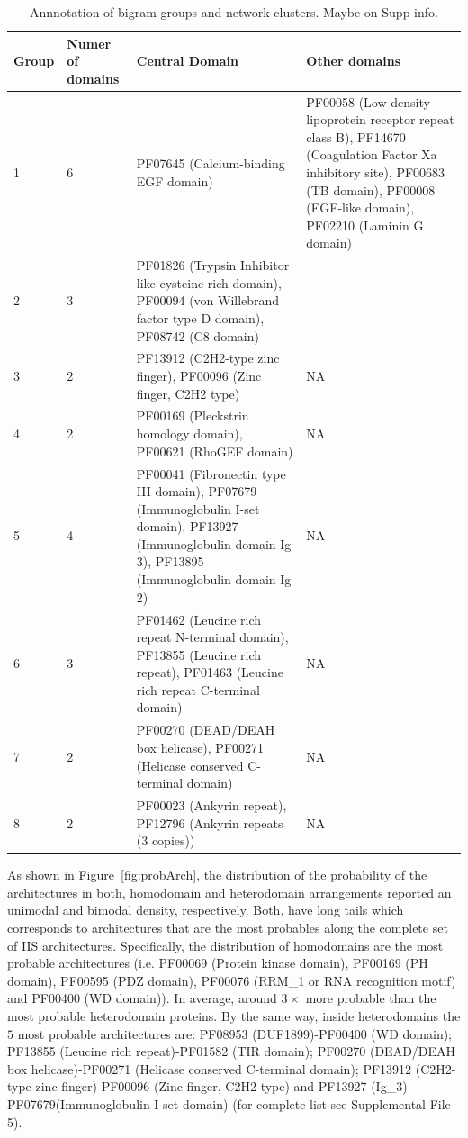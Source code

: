 \documentclass[11pt]{article}
\newcommand{\TODO}[1]{\begingroup\color{red}#1\endgroup}
\begin{document}
\begin{table}
\centering
\begin{tabular}{p{1cm}p{1.5cm}p{7cm}p{5cm}}
  \toprule 
  \textbf{Group} & \textbf{Numer of domains} & \textbf{Central Domain} & \textbf{Other domains} \\
  \midrule 
  1 & 6 & PF07645 (Calcium-binding EGF domain)& PF00058 (Low-density lipoprotein receptor repeat class B),
  PF14670 (Coagulation Factor Xa inhibitory site), PF00683 (TB domain), PF00008 (EGF-like domain), 
  PF02210 (Laminin G domain) \\
  2 & 3 & PF01826 (Trypsin Inhibitor like cysteine rich domain), PF00094 (von Willebrand factor type D domain), 
  PF08742 (C8 domain) \\
  3 & 2 & PF13912 (C2H2-type zinc finger), PF00096 (Zinc finger, C2H2 type) & NA \\
  4 & 2 & PF00169 (Pleckstrin homology domain), PF00621 (RhoGEF domain) & NA \\
  5 & 4 & PF00041 (Fibronectin type III domain), PF07679 (Immunoglobulin I-set domain), 
  PF13927 (Immunoglobulin domain Ig 3), PF13895 (Immunoglobulin domain Ig 2) & NA \\
  6 & 3 & PF01462 (Leucine rich repeat N-terminal domain), PF13855 (Leucine rich repeat),
  PF01463 (Leucine rich repeat C-terminal domain) & NA \\
  7 & 2 & PF00270 (DEAD/DEAH box helicase), PF00271 (Helicase conserved C-terminal domain) & NA \\
  8 & 2 & PF00023 (Ankyrin repeat), PF12796 (Ankyrin repeats (3 copies)) & NA \\
  \bottomrule 
\end{tabular}
\caption{Annnotation of bigram groups and network clusters. \TODO{Maybe on Supp info.}}\label{tab:meansDomains}
\end{table}

As shown in Figure~\ref{fig:probArch}, the distribution of the probability of the 
architectures in both, homodomain and heterodomain arrangements reported an unimodal 
and bimodal density, respectively. Both, have long tails which corresponds to architectures that
are the most probables along the complete set of IIS architectures.
Specifically, the distribution of homodomains are the most probable
architectures (i.e. PF00069 (Protein kinase domain), PF00169 (PH domain),
PF00595 (PDZ domain), PF00076 (RRM\_1 or RNA recognition motif) and PF00400 (WD
domain)). In average, around $3\times$ more probable than the most probable heterodomain proteins. By the same way, inside heterodomains the $5$ most probable architectures are: PF08953 (DUF1899)-PF00400 (WD domain); 
PF13855 (Leucine rich repeat)-PF01582 (TIR domain); PF00270 (DEAD/DEAH box helicase)-PF00271 
(Helicase conserved C-terminal domain); PF13912 (C2H2-type zinc finger)-PF00096
(Zinc finger, C2H2 type) and PF13927 (Ig\_3)-PF07679(Immunoglobulin I-set domain)
(for complete list see Supplemental File 5).
\end{document}
